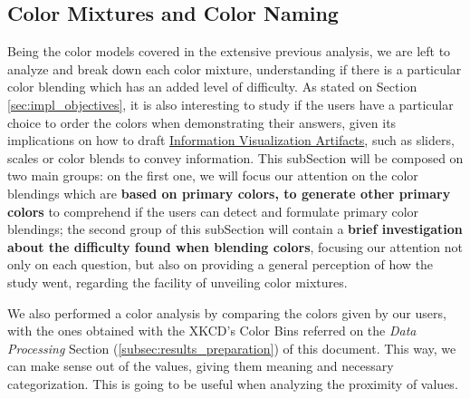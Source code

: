 \subsection{Color Mixtures and Color Naming}
\label{subsec:results_colormixtures}
%
Being the color models covered in the extensive previous analysis, we are left to analyze and break down each color mixture, understanding if there is a particular color blending which has an added level of
difficulty. As stated on Section \ref{sec:impl_objectives}, it is also interesting to study if the users have a particular choice to order the colors when demonstrating their answers, given its implications on how to draft \ul{Information Visualization Artifacts},
such as sliders, scales or color blends to convey information.
%
This subSection will be composed on two main groups: on the first one, we will focus our attention on the color blendings which are \textbf{based on primary colors, to generate other primary colors} to comprehend
if the users can detect and formulate primary color blendings; the second group of this subSection will contain a \textbf{brief investigation about the difficulty found when blending colors}, focusing our attention
not only on each question, but also on providing a general perception of how the study went, regarding the facility of unveiling color mixtures. \par
%
We also performed a color analysis by comparing the colors given by our users, with the ones obtained with the XKCD's Color Bins referred on the \emph{Data Processing} Section (\ref{subsec:results_preparation}) of this document. This way,
we can make sense out of the values, giving them meaning and necessary categorization. This is going to be useful when analyzing the proximity of values.
%
